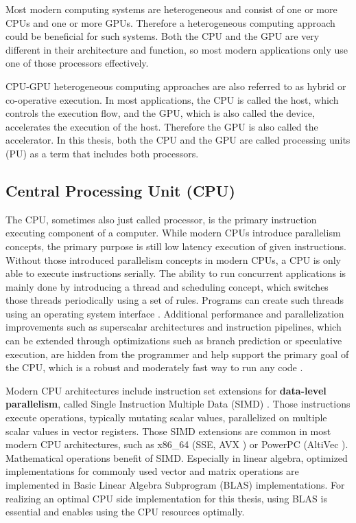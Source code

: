Most modern computing systems are heterogeneous and consist of one or more CPUs and one or more GPUs. Therefore a heterogeneous computing approach could be beneficial for such systems. Both the CPU and the GPU are very different in their architecture and function, so most modern applications only use one of those processors effectively.

CPU-GPU heterogeneous computing approaches are also referred to as hybrid or co-operative execution. In most applications, the CPU is called the host, which controls the execution flow, and the GPU, which is also called the device, accelerates the execution of the host. Therefore the GPU is also called the accelerator. In this thesis, both the CPU and the GPU are called processing units (PU) as a term that includes both processors.

\subsection{Central Processing Unit (CPU)}
The CPU, sometimes also just called processor, is the primary instruction executing component of a computer. While modern CPUs introduce parallelism concepts, the primary purpose is still low latency execution of given instructions.
Without those introduced parallelism concepts in modern CPUs, a CPU is only able to execute instructions serially. The ability to run concurrent applications is mainly done by introducing a thread and scheduling concept, which switches those threads periodically using a set of rules. Programs can create such threads using an operating system interface \cite{nemirovskyMultithreadingArchitecture2013}.
Additional performance and parallelization improvements such as superscalar architectures and instruction pipelines, which can be extended through optimizations such as branch prediction or speculative execution, are hidden from the programmer and help support the primary goal of the CPU, which is a robust and moderately fast way to run any code \cite{johnsonSuperScalarProcessorDesign, falsafiPrimerHardwarePrefetching2014, smithStudyBranchPrediction1998}.

Modern CPU architectures include instruction set extensions for \textbf{data-level parallelism}, called Single Instruction Multiple Data (SIMD) \cite{barnesILLIACIVComputer1968,smartFullyHomomorphicSIMD2014, VectorExtensionsUsing}. Those instructions execute operations, typically mutating scalar values, parallelized on multiple scalar values in vector registers. Those SIMD extensions are common in most modern CPU architectures, such as x86\_64 (SSE, AVX \cite{IntelIntrinsicsGuide}) or PowerPC (AltiVec \cite{diefendorffAltiVecExtensionPowerPC2000}). Mathematical operations benefit of SIMD. Especially in linear algebra, optimized implementations for commonly used vector and matrix operations are implemented in Basic Linear Algebra Subprogram (BLAS) \cite{lawsonBasicLinearAlgebra1979} implementations. For realizing an optimal CPU side implementation for this thesis, using BLAS is essential and enables using the CPU resources optimally.

